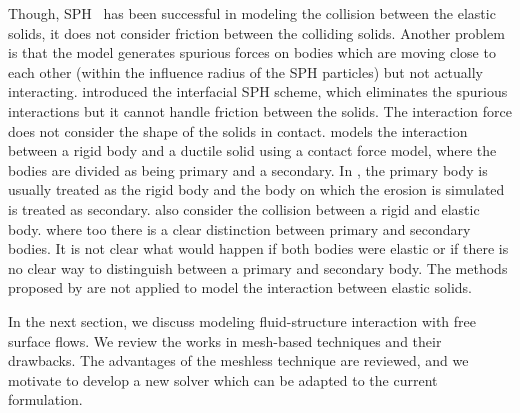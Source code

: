 Though, SPH~\citep{gray2001sph} has been successful in modeling the collision
between the elastic solids, it does not consider friction between the colliding
solids. Another problem is that the model generates spurious forces on bodies
which are moving close to each other (within the influence radius of the SPH
particles) but not actually interacting. \cite{yan2021simulation} introduced the
interfacial SPH scheme, which eliminates the spurious interactions but it cannot
handle friction between the solids. The interaction force does not consider the
shape of the solids in contact. \cite{mohseni2021particle} models the
interaction between a rigid body and a ductile solid using a contact force
model, where the bodies are divided as being primary and a secondary. In
\citep{mohseni2021particle}, the primary body is usually treated as the rigid
body and the body on which the erosion is simulated is treated as secondary.
\cite{vyas2021collisional} also consider the collision between a rigid and
elastic body. \cite{vyas2021collisional} where too there is a clear distinction
between primary and secondary bodies. It is not clear what would happen if both
bodies were elastic or if there is no clear way to distinguish between a primary
and secondary body. The methods proposed by
\cite{vyas2021collisional,mohseni2021particle} are not applied to model the
interaction between elastic solids.

In the next section, we discuss modeling fluid-structure interaction with free
surface flows. We review the works in mesh-based techniques and their drawbacks.
The advantages of the meshless technique are reviewed, and we motivate to
develop a new solver which can be adapted to the current formulation.


